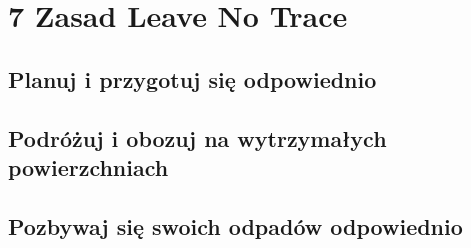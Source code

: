 \documentclass[11pt,fleqn]{book} %
\begin{document}

\pagestyle{empty} %

\tableofcontents %

\cleardoublepage %

\pagestyle{fancy} %


\part{7 Zasad Leave No Trace}



\chapter{Planuj i przygotuj się odpowiednio}
\label{rule1-plan-ahead}


\chapter{Podróżuj i obozuj na wytrzymałych powierzchniach}
\label{rule2-camp-and-travel}


\chapter{Pozbywaj się swoich odpadów odpowiednio}
\label{rule3-trash}

\end{document}

